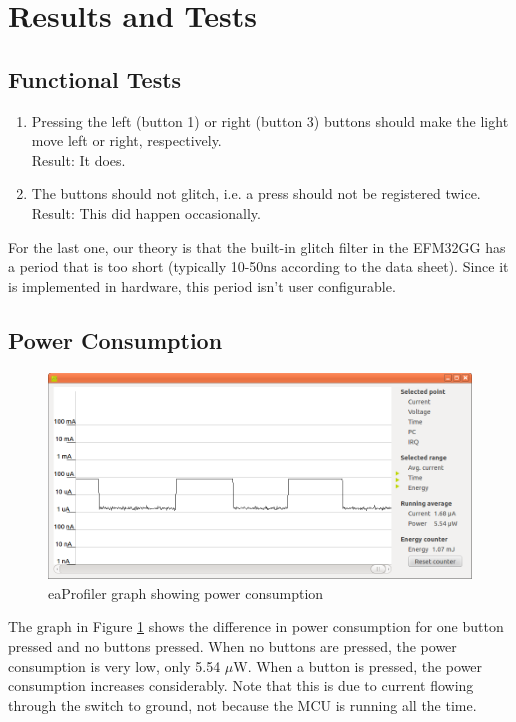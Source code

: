 \documentclass[a4paper, 12pt]{article}
\begin{document}
\section{Results and Tests} %
\label{sec:results_and_tests}
	\subsection{Functional Tests} %
	\label{sub:functional_tests}
		\begin{enumerate}
			\item Pressing the left (button 1) or right (button 3) buttons should make the light move left or right, respectively. \\
				  Result: It does.
			\item The buttons should not glitch, i.e. a press should not be registered twice.\\
				  Result: This did happen occasionally.
		\end{enumerate}
		For the last one, our theory is that the built-in glitch filter in the EFM32GG has a period that is too short (typically 10-50ns according to the data sheet). Since it is implemented in hardware, this period isn't user configurable.

	\subsection{Power Consumption} %
	\label{sub:power_consumption}
		\begin{figure}[!ht]
        \includegraphics[width=\textwidth]{eaprofiler}
        \caption{eaProfiler graph showing power consumption}
        \label{fig:profiler}
        \end{figure}
        The graph in Figure \ref{fig:profiler} shows the difference in power consumption for one button pressed and no buttons pressed. When no buttons are pressed, the power consumption is very low, only 5.54 $\mu$W. When a button is pressed, the power consumption increases considerably. Note that this is due to current flowing through the switch to ground, not because the MCU is running all the time.
\end{document}
